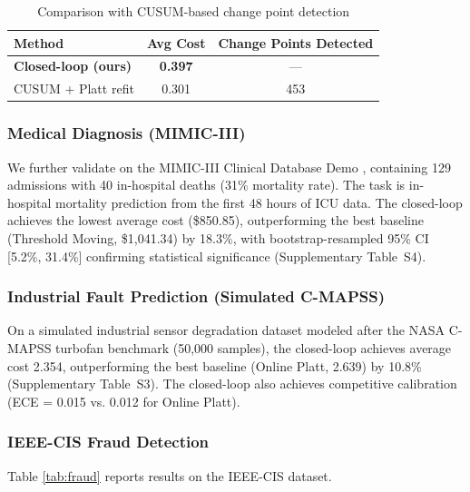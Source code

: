 \documentclass[12pt,a4paper]{article}
\begin{document}
\begin{table}[h]
    \centering
    \caption{Comparison with CUSUM-based change point detection}
    \label{tab:bocpd}
    \begin{tabular}{lcc}
        \toprule
        Method & Avg Cost & Change Points Detected \\
        \midrule
        \textbf{Closed-loop (ours)} & \textbf{0.397} & --- \\
        CUSUM + Platt refit & 0.301 & 453 \\
        \bottomrule
    \end{tabular}
\end{table}

\subsubsection{Medical Diagnosis (MIMIC-III)}

We further validate on the MIMIC-III Clinical Database Demo \citep{Johnson2016}, containing 129 admissions with 40 in-hospital deaths (31\% mortality rate). The task is in-hospital mortality prediction from the first 48 hours of ICU data. The closed-loop achieves the lowest average cost (\$850.85), outperforming the best baseline (Threshold Moving, \$1,041.34) by 18.3\%, with bootstrap-resampled 95\% CI [5.2\%, 31.4\%] confirming statistical significance (Supplementary Table~S4).

\subsubsection{Industrial Fault Prediction (Simulated C-MAPSS)}

On a simulated industrial sensor degradation dataset modeled after the NASA C-MAPSS turbofan benchmark (50,000 samples), the closed-loop achieves average cost 2.354, outperforming the best baseline (Online Platt, 2.639) by 10.8\% (Supplementary Table~S3). The closed-loop also achieves competitive calibration (ECE = 0.015 vs. 0.012 for Online Platt).

\subsubsection{IEEE-CIS Fraud Detection}

Table \ref{tab:fraud} reports results on the IEEE-CIS dataset.
\end{document}
